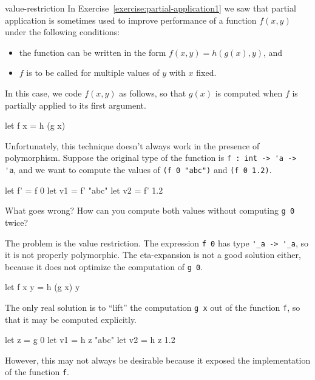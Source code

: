 %
\begin{exercise}{value-restriction}
In Exercise~\ref{exercise:partial-application1} we saw that partial application is sometimes used to
improve performance of a function $f(x, y)$ under the following conditions:
\begin{itemize}
\item the function can be written in the form $f(x, y) = h(g(x), y)$, and
\item $f$ is to be called for multiple values of $y$ with $x$ fixed.
\end{itemize}
%
In this case, we code $f(x, y)$ as follows, so that $g(x)$ is computed when $f$ is partially
applied to its first argument.

\begin{ocaml}
let f x = h (g x)
\end{ocaml}
%
Unfortunately, this technique doesn't always work in the presence of polymorphism.
Suppose the original type of the function is \hbox{\lstinline/f : int -> 'a -> 'a/},
and we want to compute the values of \hbox{\lstinline/(f 0 "abc")/} and \hbox{\lstinline/(f 0 1.2)/}.

\begin{ocaml}
let f' = f 0
let v1 = f' "abc"
let v2 = f' 1.2
\end{ocaml}
%
What goes wrong?  How can you compute both values without computing \hbox{\lstinline/g 0/} twice?

\begin{answer}\ifanswers
The problem is the value restriction.  The expression \hbox{\lstinline/f 0/} has type
%
\hbox{\lstinline/'_a -> '_a/}, so it is not properly polymorphic.  The eta-expansion is not a good solution either,
because it does not optimize the computation of \hbox{\lstinline/g 0/}.
\begin{ocaml}
let f x y = h (g x) y
\end{ocaml}

The only real solution is to ``lift'' the computation \hbox{\lstinline/g x/} out of the function \hbox{\lstinline/f/},
so that it may be computed explicitly.

\begin{ocaml}
let z = g 0
let v1 = h z "abc"
let v2 = h z 1.2
\end{ocaml}
%
However, this may not always be desirable because it exposed the implementation of the function
\hbox{\lstinline/f/}.
\fi\end{answer}
\end{exercise}

